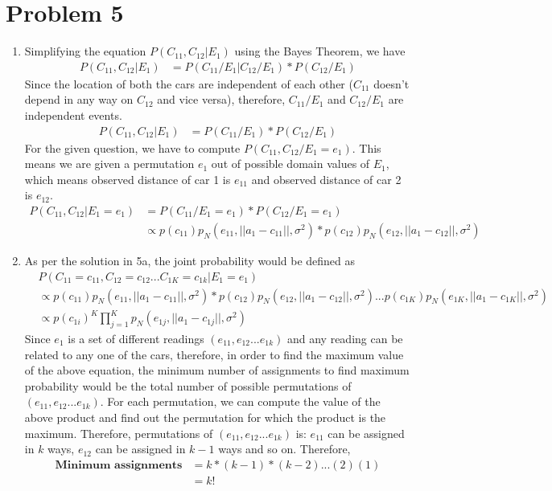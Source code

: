 \documentclass[12pt]{article}
\begin{document}
\section*{Problem 5}

\begin{enumerate}[label=(\alph*)]
  \item Simplifying the equation $P (C_{11}, C_{12} | E_1)$ using the Bayes Theorem, we have
  \begin{align*}
  P (C_{11}, C_{12} | E_1) &= P(C_{11}/E_1| C_{12}/E_1) * P(C_{12}/E_1)
  \end{align*}
  Since the location of both the cars are independent of each other ($C_{11}$ doesn't depend in any way on $C_{12}$ and vice versa), therefore, $C_{11}/E_1$ and $C_{12}/E_1$ are independent events.
  \begin{align*}
  P (C_{11}, C_{12} | E_1) &= P(C_{11}/E_1) * P(C_{12}/E_1)
  \end{align*}
  For the given question, we have to compute $P(C_{11}, C_{12} / E_1 = e_1)$. This means we are given a permutation $e_1$ out of possible domain values of $E_1$, which means observed distance of car 1 is $e_{11}$ and observed distance of car 2 is $e_{12}$.
    \begin{align*}
  P (C_{11}, C_{12} | E_1 = e_1) &= P(C_{11}/E_1 = e_1) * P(C_{12}/E_1 = e_1) \\
  &\propto p(c_{11})p_N (e_{11}, || a_1 - c_{11} ||, \sigma^2) * p(c_{12})p_N (e_{12}, || a_1 - c_{12} ||, \sigma^2)
  \end{align*}
  \item As per the solution in 5a, the joint probability would be defined as
  \begin{align*}
  &P (C_{11} = c_{11}, C_{12} = c_{12} ... C_{1K} = c_{1k} | E_1 = e_1) \\ &\propto p(c_{11})p_N (e_{11}, || a_1 - c_{11} ||, \sigma^2) * p(c_{12})p_N (e_{12}, || a_1 - c_{12} ||, \sigma^2) ... p(c_{1K}) p_N (e_{1K}, || a_1 - c_{1K} ||, \sigma^2) \\
& \propto p(c_{1i})^K \prod_{j=1}^{K} p_N(e_{1j}, || a_1 - c_{1j} ||, \sigma^2)
  \end{align*}
  Since $e_1$ is a set of different readings $(e_{11}, e_{12} ... e_{1k})$ and any reading can be related to any one of the cars, therefore, in order to find the maximum value of the above equation, the minimum number of assignments to find maximum probability would be the total number of possible permutations of $(e_{11}, e_{12} ... e_{1k})$. For each permutation, we can compute the value of the above product and find out the permutation for which the product is the maximum. Therefore, permutations of $(e_{11}, e_{12} ... e_{1k})$ is: $e_{11}$ can be assigned in $k$ ways, $e_{12}$ can be assigned in $k-1$ ways and so on. Therefore, 
  \begin{align*}
  \textbf{Minimum assignments} &= k * (k-1) * (k-2) ... (2) (1) \\
  &= k!
\end{align*}
\end{enumerate}
\end{document}
